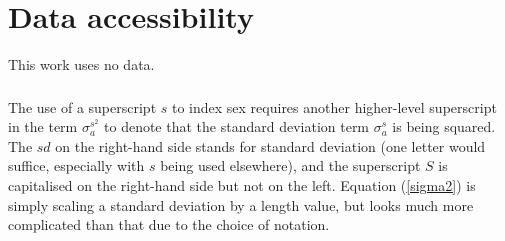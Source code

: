 \section*{Data accessibility}

This work uses no data.



\clearpage

\thispagestyle{empty}






\begin{frame}
\frametitle{}
\bi
  \item
\ei
\end{frame}

The use of a superscript $s$ to index sex requires another higher-level
superscript in the term $\sigma_a^{s^2}$ to denote that the standard deviation
term $\sigma_a^s$ is being squared. The $sd$ on the right-hand side stands for
standard deviation (one letter would suffice, especially with $s$ being used
elsewhere), and the superscript $S$ is capitalised on the right-hand side but not
on the left. Equation (\ref{sigma2}) is simply scaling a standard deviation by
a length value, but looks much more complicated than that due to the choice
of notation.
